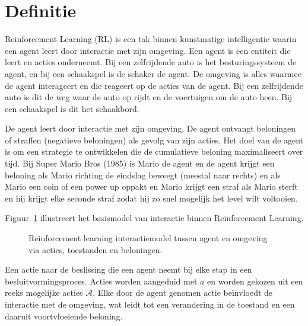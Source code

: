 \documentclass[a4paper,12pt]{report}
\begin{document}
\section{Definitie}
Reinforcement Learning (RL) is een tak binnen kunstmatige intelligentie waarin
een agent leert door interactie met zijn omgeving. Een agent is een entiteit
die leert en acties onderneemt. Bij een zelfrijdende auto is het
besturingssysteem de agent, en bij een schaakspel is de schaker de agent. De
omgeving is alles waarmee de agent interageert en die reageert op de acties van
de agent. Bij een zelfrijdende auto is dit de weg waar de auto op rijdt en de
voertuigen om de auto heen. Bij een schaakspel is dit het schaakbord.

De agent leert door interactie met zijn omgeving. De agent ontvangt beloningen
of straffen (negatieve beloningen) als gevolg van zijn acties. Het doel van de
agent is om een strategie te ontwikkelen die de cumulatieve beloning
maximaliseert over tijd. Bij Super Mario Bros (1985) is Mario de agent en de
agent krijgt een beloning als Mario richting de eindslag beweegt (meestal naar
rechts) en als Mario een coin of een power up oppakt en Mario krijgt een straf
als Mario sterft en hij krijgt elke seconde straf zodat hij zo snel mogelijk
het level wilt voltooien.

Figuur~\ref{fig:rl_model} illustreert het basismodel van interactie binnen
Reinforcement Learning.
\begin{figure}[h]
  \caption{Reinforcement learning interactiemodel tussen agent en omgeving via acties, toestanden en beloningen.}
  \label{fig:rl_model}
\end{figure}

Een actie naar de beslissing die een agent neemt bij elke stap in een
besluitvormingsproces. Acties worden aangeduid met \( a \) en worden gekozen
uit een reeks mogelijke acties \( \mathcal{A} \). Elke door de agent genomen
actie beïnvloedt de interactie met de omgeving, wat leidt tot een verandering
in de toestand en een daaruit voortvloeiende beloning.
\end{document}
